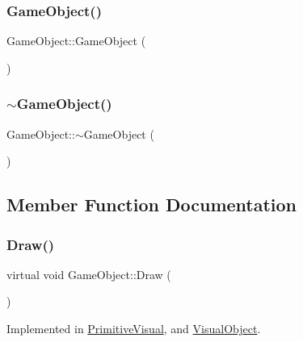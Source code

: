 \subsubsection{\texorpdfstring{GameObject()}{GameObject()}}
{\footnotesize\ttfamily Game\+Object\+::\+Game\+Object (\begin{DoxyParamCaption}{ }\end{DoxyParamCaption})}

\mbox{\label{class_game_object_ab82dfdb656f9051c0587e6593b2dda97}} 
\subsubsection{\texorpdfstring{$\sim$GameObject()}{~GameObject()}}
{\footnotesize\ttfamily Game\+Object\+::$\sim$\+Game\+Object (\begin{DoxyParamCaption}{ }\end{DoxyParamCaption})}



\subsection{Member Function Documentation}
\mbox{\label{class_game_object_a29a665f46fda87982825bc5c0ca6a888}} 
\subsubsection{\texorpdfstring{Draw()}{Draw()}}
{\footnotesize\ttfamily virtual void Game\+Object\+::\+Draw (\begin{DoxyParamCaption}{ }\end{DoxyParamCaption})\hspace{0.3cm}{\ttfamily [pure virtual]}}



Implemented in \mbox{\hyperlink{class_primitive_visual_a9ce21acf4bb9b9d9ac24c75f6aa9aec3}{Primitive\+Visual}}, and \mbox{\hyperlink{class_visual_object_a10c0e01e375fd4af08e57f3475dd312c}{Visual\+Object}}.

\mbox{\label{class_game_object_a78bf45c8ef3805247435583556087788}} 
